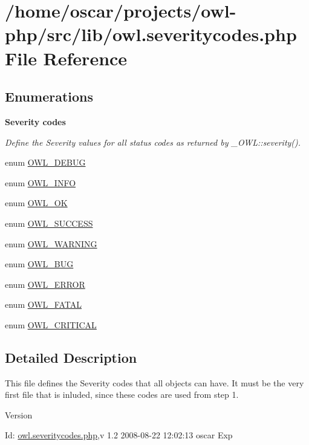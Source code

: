 \section{/home/oscar/projects/owl-\/php/src/lib/owl.severitycodes.php File Reference}
\label{owl_8severitycodes_8php}
\subsection*{Enumerations}
\begin{Indent}{\bf Severity codes}\par
{\em \label{_amgrp0bfaa46a9f56b89183011b68383e13d0}
 Define the Severity values for all status codes as returned by \_\-OWL::severity(). }\begin{DoxyCompactItemize}
\item 
enum \hyperlink{owl_8severitycodes_8php_adf6a439e74801dd83160f085e9af5546}{OWL\_\-DEBUG} 
\item 
enum \hyperlink{owl_8severitycodes_8php_a139328861128689f2f4def6a399d9057}{OWL\_\-INFO} 
\item 
enum \hyperlink{owl_8severitycodes_8php_abc72c053cfd10025fe57797c41eab18e}{OWL\_\-OK} 
\item 
enum \hyperlink{owl_8severitycodes_8php_a96223f06ba27bf5cbefa6e9d702897c2}{OWL\_\-SUCCESS} 
\item 
enum \hyperlink{owl_8severitycodes_8php_ace886152e2e86cd2e91cb833fd495adb}{OWL\_\-WARNING} 
\item 
enum \hyperlink{owl_8severitycodes_8php_a97e9838587d4386a48d7e40020bf0a7f}{OWL\_\-BUG} 
\item 
enum \hyperlink{owl_8severitycodes_8php_ab57d46c4dff0628f7f46aa11db9325c9}{OWL\_\-ERROR} 
\item 
enum \hyperlink{owl_8severitycodes_8php_a4c27106ebf80027ef1ebf953ed172e76}{OWL\_\-FATAL} 
\item 
enum \hyperlink{owl_8severitycodes_8php_a4628d2e3b0d08692a62a1b8cad05465b}{OWL\_\-CRITICAL} 
\end{DoxyCompactItemize}
\end{Indent}


\subsection{Detailed Description}
This file defines the Severity codes that all objects can have. It must be the very first file that is inluded, since these codes are used from step 1. \begin{DoxyVersion}{Version}

\end{DoxyVersion}
\begin{DoxyParagraph}{Id:}
\hyperlink{owl_8severitycodes_8php}{owl.severitycodes.php},v 1.2 2008-\/08-\/22 12:02:13 oscar Exp 
\end{DoxyParagraph}


